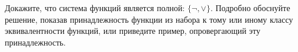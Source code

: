 \question
Докажите, что система функций является полной: $\{\neg, \vee\}$. Подробно обоснуйте решение, показав  принадлежность функции из набора к тому или иному классу эквивалентности функций, или приведите пример, опровергающий эту принадлежность.

